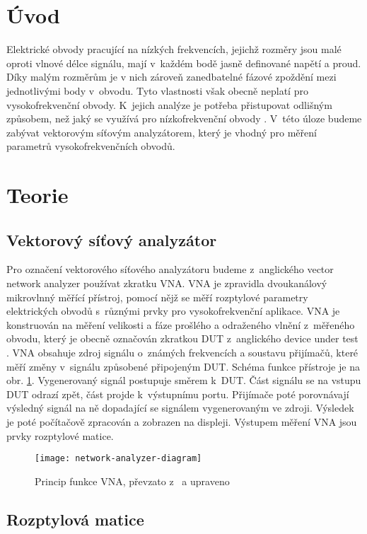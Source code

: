 \documentclass{protokol}
\begin{document}
\headernoenv

\section{Úvod}
Elektrické obvody pracující na nízkých frekvencích, jejichž rozměry jsou malé oproti vlnové délce signálu, mají v~každém bodě jasně definované napětí a proud. Díky malým rozměrům je v nich zároveň zanedbatelné fázové zpoždění mezi jednotlivými body v~obvodu. Tyto vlastnosti však obecně neplatí pro vysokofrekvenční obvody. K~jejich analýze je potřeba přistupovat odlišným způsobem, než jaký se využívá pro nízkofrekvenční obvody \cite{Pozar}.
V~této úloze budeme zabývat vektorovým síťovým analyzátorem, který je vhodný pro měření parametrů vysokofrekvenčních obvodů.

\section{Teorie}

\subsection{Vektorový síťový analyzátor}

Pro označení vektorového síťového analyzátoru budeme z~anglického vector network analyzer používat zkratku VNA. VNA je zpravidla dvoukanálový mikrovlnný měřící přístroj, pomocí nějž se měří rozptylové parametry elektrických obvodů s~různými prvky pro vysokofrekvenční aplikace. VNA je konstruován na měření velikosti a fáze prošlého a odraženého vlnění z~měřeného obvodu, který je obecně označován zkratkou DUT z~anglického device under test \cite{Pozar}.
VNA obsahuje zdroj signálu o~známých frekvencích a soustavu přijímačů, které měří změny v~signálu způsobené připojeným DUT. Schéma funkce přístroje je na obr. \ref{VNA}. Vygenerovaný signál postupuje směrem k~DUT. Část signálu se na vstupu DUT odrazí zpět, část projde k~výstupnímu portu. Přijímače poté porovnávají výsledný signál na ně dopadající se signálem vygenerovaným ve zdroji. Výsledek je poté počítačově zpracován a zobrazen na displeji. Výstupem měření VNA jsou prvky rozptylové matice.

\begin{figure}[b]
	\centering
	\texttt{[image: network-analyzer-diagram]}
	\caption{Princip funkce VNA, převzato z~\cite{schema} a upraveno}
	\label{VNA}
\end{figure}


\subsection{Rozptylová matice}
\end{document}
